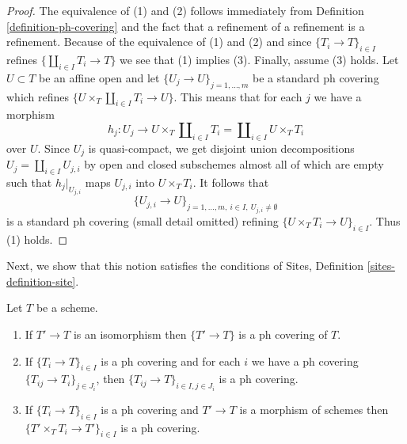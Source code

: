 \begin{proof}
The equivalence of (1) and (2) follows immediately from
Definition \ref{definition-ph-covering}
and the fact that a refinement of a refinement is a refinement.
Because of the equivalence of (1) and (2) and since
$\{T_i \to T\}_{i \in I}$ refines $\{\coprod_{i \in I} T_i \to T\}$
we see that (1) implies (3). Finally, assume (3) holds.
Let $U \subset T$ be an affine open and let
$\{U_j \to U\}_{j = 1, \ldots, m}$ be a standard ph covering
which refines $\{U \times_T \coprod_{i \in I} T_i \to U\}$.
This means that for each $j$ we have a morphism
$$
h_j :
U_j
\longrightarrow
U \times_T \coprod\nolimits_{i \in I} T_i =
\coprod\nolimits_{i \in I} U \times_T T_i
$$
over $U$. Since $U_j$ is quasi-compact, we get
disjoint union decompositions $U_j = \coprod_{i \in I} U_{j, i}$
by open and closed subschemes almost all of which are empty
such that $h_j|_{U_{j, i}}$ maps $U_{j, i}$ into $U \times_T T_i$.
It follows that
$$
\{U_{j, i} \to U\}_{j = 1, \ldots, m,\ i \in I,\ U_{j, i} \not = \emptyset}
$$
is a standard ph covering (small detail omitted) refining
$\{U \times_T T_i \to U\}_{i \in I}$. Thus (1) holds.
\end{proof}

\noindent
Next, we show that this notion satisfies the conditions of
Sites, Definition \ref{sites-definition-site}.

\begin{lemma}
\label{lemma-ph}
Let $T$ be a scheme.
\begin{enumerate}
\item If $T' \to T$ is an isomorphism then $\{T' \to T\}$
is a ph covering of $T$.
\item If $\{T_i \to T\}_{i\in I}$ is a ph covering and for each
$i$ we have a ph covering $\{T_{ij} \to T_i\}_{j\in J_i}$, then
$\{T_{ij} \to T\}_{i \in I, j\in J_i}$ is a ph covering.
\item If $\{T_i \to T\}_{i\in I}$ is a ph covering
and $T' \to T$ is a morphism of schemes then
$\{T' \times_T T_i \to T'\}_{i\in I}$ is a ph covering.
\end{enumerate}
\end{lemma}

